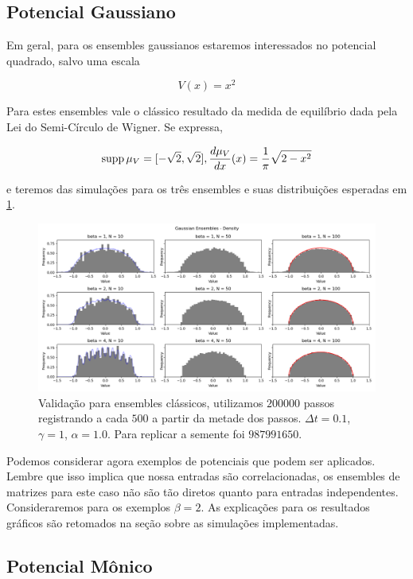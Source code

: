 \subsection{Potencial Gaussiano}

Em geral, para os ensembles gaussianos estaremos interessados no potencial quadrado, salvo uma escala

\[
	V(x) = x^2
\]

Para estes ensembles vale o clássico resultado da medida de equilíbrio dada pela Lei do Semi-Círculo de Wigner. Se expressa,

\[
\operatorname{supp} \mu_V = [-\sqrt{2}, \sqrt{2}], \frac{d \mu_V}{dx}(x) = \frac{1}{\pi} \sqrt{2 - x^2} 
\]

e teremos das simulações para os três ensembles e suas distribuições esperadas em \ref{fig: semicircle}.

\begin{figure}[ht!]
	\centering
	\includegraphics[scale=0.45]{Assets/validationArticleAlg}
	\caption{Validação para ensembles clássicos, utilizamos $200000$ passos registrando a cada $500$ a partir da metade dos passos. $\Delta t = 0.1$, $\gamma = 1$, $\alpha = 1.0$. Para replicar a semente foi $987991650$.}
	\label{fig: semicircle}
\end{figure}

Podemos considerar agora exemplos de potenciais que podem ser aplicados. Lembre que isso implica que nossa entradas são correlacionadas, os ensembles de matrizes para este caso não são tão diretos quanto para entradas independentes. Consideraremos para os exemplos $\beta = 2$. As explicações para os resultados gráficos são retomados na seção sobre as simulações implementadas.


\subsection{Potencial Mônico}

